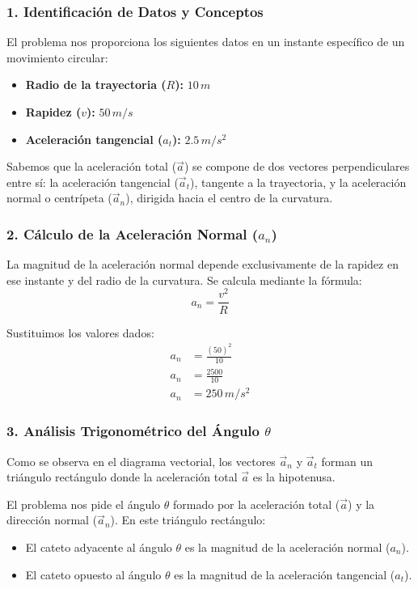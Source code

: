 \documentclass[12pt, a4paper]{article}
\begin{document}
\subsubsection*{1. Identificación de Datos y Conceptos}
El problema nos proporciona los siguientes datos en un instante específico de un movimiento circular:
\begin{itemize}
    \item \textbf{Radio de la trayectoria ($R$):} $10 \, \si{m}$
    \item \textbf{Rapidez ($v$):} $50 \, \si{m/s}$
    \item \textbf{Aceleración tangencial ($a_t$):} $2.5 \, \si{m/s^2}$
\end{itemize}

Sabemos que la aceleración total ($\vec{a}$) se compone de dos vectores perpendiculares entre sí: la aceleración tangencial ($\vec{a}_t$), tangente a la trayectoria, y la aceleración normal o centrípeta ($\vec{a}_n$), dirigida hacia el centro de la curvatura.

\subsubsection*{2. Cálculo de la Aceleración Normal ($a_n$)}
La magnitud de la aceleración normal depende exclusivamente de la rapidez en ese instante y del radio de la curvatura. Se calcula mediante la fórmula:
$$ a_n = \frac{v^2}{R} $$

Sustituimos los valores dados:
\begin{align*}
    a_n &= \frac{(50)^2}{10} \\
    a_n &= \frac{2500}{10} \\
    a_n &= 250 \, \si{m/s^2}
\end{align*}

\subsubsection*{3. Análisis Trigonométrico del Ángulo $\theta$}
Como se observa en el diagrama vectorial, los vectores $\vec{a}_n$ y $\vec{a}_t$ forman un triángulo rectángulo donde la aceleración total $\vec{a}$ es la hipotenusa. 

El problema nos pide el ángulo $\theta$ formado por la aceleración total ($\vec{a}$) y la dirección normal ($\vec{a}_n$). En este triángulo rectángulo:
\begin{itemize}
    \item El cateto adyacente al ángulo $\theta$ es la magnitud de la aceleración normal ($a_n$).
    \item El cateto opuesto al ángulo $\theta$ es la magnitud de la aceleración tangencial ($a_t$).
\end{itemize}
\end{document}
